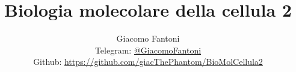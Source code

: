 

\title{\Huge \textbf{Biologia molecolare della cellula 2}}

\author{
  Giacomo Fantoni \\
  \small Telegram: \href{https://t.me/GiacomoFantoni}{@GiacomoFantoni} \\[3pt]
  \small Github: \href{https://github.com/giacThePhantom/BioMolCellula2}{https://github.com/giacThePhantom/BioMolCellula2}}

\maketitle
\tableofcontents










